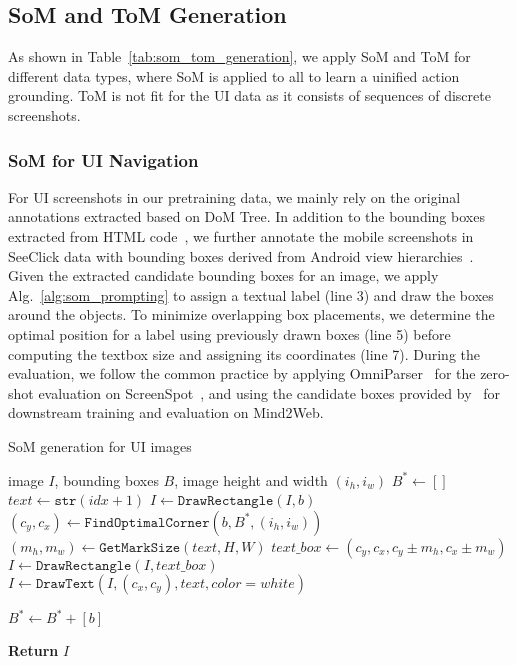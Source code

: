 \subsection{SoM and ToM Generation}

As shown in Table~\ref{tab:som_tom_generation}, we apply SoM and ToM for different data types, where SoM is applied to all to learn a uinified action grounding. ToM is not fit for the UI data as it consists of sequences of discrete screenshots.

\subsubsection{SoM for UI Navigation}

For UI screenshots in our pretraining data, we mainly rely on the original annotations extracted based on DoM Tree. In addition to the bounding boxes extracted from HTML code~\cite{seeclick,gui2024vision2uirealworlddatasetlayout}, we further annotate the mobile screenshots in SeeClick data with bounding boxes derived from Android view hierarchies~\cite{rico_semantics}. 
Given the extracted candidate bounding boxes for an image, we apply Alg.~\ref{alg:som_prompting} to assign a textual label (line 3) and draw the boxes around the objects. To minimize overlapping box placements, we determine the optimal position for a label using previously drawn boxes (line 5) before computing the textbox size and assigning its coordinates (line 7). During the evaluation, we follow the common practice by applying OmniParser~\cite{lu2024omniparser} for the zero-shot evaluation on ScreenSpot~\cite{seeclick}, and using the candidate boxes provided by~\cite{mind2web} for downstream training and evaluation on Mind2Web.
\begin{algorithm}[t]
\caption{SoM generation for UI images}
\label{alg:som_generation}
\begin{algorithmic}[1]
    \Require image $I$, bounding boxes $B$, image height and width $(i_h, i_w)$
    \State $B^* \gets []$ 
        \State $text \gets \texttt{str}(idx+1)$
        \State $I \gets \texttt{DrawRectangle}(I, b)$
        \State $(c_y, c_x) \gets \texttt{FindOptimalCorner}(b, B^*, (i_h, i_w))$
        \textcolor{commentcolor}{}
        \State $(m_h, m_w) \gets \texttt{GetMarkSize}(text, H, W)$        
        \State $text\_box \gets (c_y, c_x, c_y \pm m_h, c_x \pm m_w)$
        \State $I \gets \texttt{DrawRectangle}(I, text\_box)$
        \State $I \gets \texttt{DrawText}(I, (c_x, c_y), text, color=white)$
        
        \State $B^* \gets B^* + [b]$ \textcolor{commentcolor}{}
    \EndFor
    
    \State \textbf{Return} $I$
\end{algorithmic}
\label{alg:som_prompting}
\end{algorithm}

